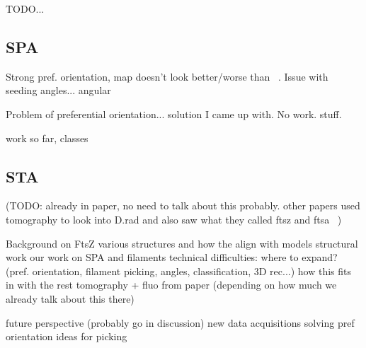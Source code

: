 TODO...

\subsection{SPA}

Strong pref. orientation, map doesn't look better/worse than ~\citet{fujitaStructuresFtsZSingle2023}.
Issue with seeding angles... angular

Problem of preferential orientation... solution I came up with. No work. stuff.

work so far, classes

\subsection{STA}

(TODO: already in paper, no need to talk about this probably. other papers used tomography to look into D.rad and also saw what they called ftsz and ftsa ~\cite{sextonSuperresolutionConfocalCryoCLEM2022})

\begin{outline}
\1 Background on FtsZ
    \2 various structures and how the align with models
\1 structural work
    \2 our work on SPA and filaments
        \3 technical difficulties: where to expand? (pref. orientation, filament picking, angles, classification, 3D rec...)
    \2 how this fits in with the rest
    \2 tomography + fluo from paper (depending on how much we already talk about this there)

\1 future perspective (probably go in discussion)
    \2 new data acquisitions
    \2 solving pref orientation
    \2 ideas for picking
\end{outline}
